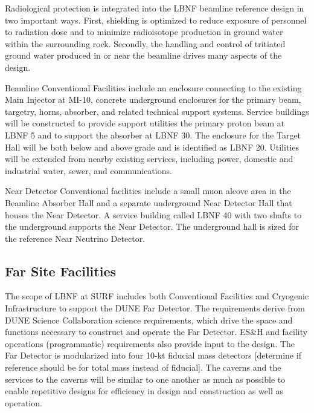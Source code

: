 Radiological protection is integrated into the LBNF beamline reference design in two important ways. First, shielding is optimized to reduce exposure of personnel to radiation dose and to minimize radioisotope production in ground water within the surrounding rock. Secondly, the handling and control of tritiated ground water produced in or near the beamline drives many aspects of the design. 

Beamline Conventional Facilities include an enclosure connecting to the existing Main Injector at MI-10, concrete underground enclosures for the primary beam, targetry, horns, absorber, and related technical support systems. Service buildings will be constructed to provide support utilities the primary proton beam at LBNF 5 and to support the absorber at LBNF 30. The enclosure for the Target Hall will be both below and above grade and is identified as LBNF 20.  Utilities will be extended from nearby existing services, including power, domestic and industrial water, sewer, and communications. 

Near Detector Conventional facilities include a small muon alcove area in the Beamline Absorber Hall and a separate underground Near Detector Hall that houses the Near Detector. A service building called LBNF 40 with two shafts to the underground supports the Near Detector. The underground hall is sized for the reference Near Neutrino Detector.

\subsection{Far Site Facilities}

The scope of LBNF at SURF includes both Conventional Facilities and Cryogenic Infrastructure to support the DUNE Far Detector. The requirements derive from DUNE Science Collaboration science requirements, which drive the space and functions necessary to construct and operate the Far Detector.  ES\&H and facility operations (programmatic) requirements also provide input to the design. The Far Detector is modularized into four 10-kt fiducial mass detectors [determine if reference should be for total mass instead of fiducial]. The caverns and the services to the caverns will be similar to one another as much as possible to enable repetitive designs for efficiency in design and construction as well as operation. 

